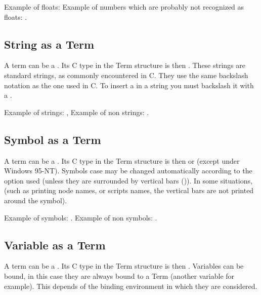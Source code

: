 Example of floats:  \* 
Example of numbers which are probably not recognized as floats: .

\subsection{String as a Term}

A term can be a . Its C type in the Term structure is then
. These strings are standard strings, as commonly encountered in
C. They use the same backslash notation as the one used in C. To insert a
 in a string you must backslash it with a \samp{\\}.

Example of strings: , \*
 \*
Example of non strings: .

\subsection{Symbol as a Term}

A term can be a . Its C type in the Term structure is then
 or  (except under Windows 95-NT). Symbols case may be
changed automatically according to the option used (unless they are surrounded
by vertical bars (\samp{|})). In some situations, (such as printing node names,
or scripts names, the vertical bars are not printed around the symbol).

Example of symbols: .\*
Example of non symbols: .

\subsection{Variable as a Term}

A term can be a . Its C type in the Term structure is then
. Variables can be bound, in this case they are always bound to
a Term (another variable for example). This depends of the binding environment
in which they are considered.


